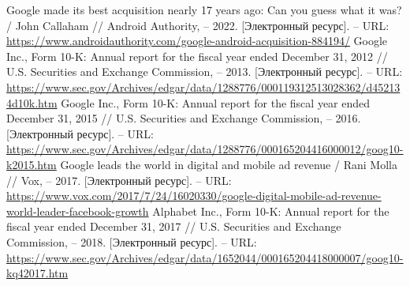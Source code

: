 \documentclass{article}
\begin{document}
\begin{thebibliography}{2}
 Google made its best acquisition nearly 17 years ago: Can you guess what it was? / John Callaham // Android Authority, – 2022. [Электронный ресурс]. – URL: \url{https://www.androidauthority.com/google-android-acquisition-884194/}
 Google Inc., Form 10-K: Annual report for the fiscal year ended December 31, 2012 // U.S. Securities and Exchange Commission, – 2013. [Электронный ресурс]. – URL: \url{https://www.sec.gov/Archives/edgar/data/1288776/000119312513028362/d452134d10k.htm}
 Google Inc., Form 10-K: Annual report for the fiscal year ended December 31, 2015 // U.S. Securities and Exchange Commission, – 2016. [Электронный ресурс]. – URL: \url{https://www.sec.gov/Archives/edgar/data/1288776/000165204416000012/goog10-k2015.htm}
 Google leads the world in digital and mobile ad revenue / Rani Molla // Vox, – 2017. [Электронный ресурс]. – URL: \url{https://www.vox.com/2017/7/24/16020330/google-digital-mobile-ad-revenue-world-leader-facebook-growth}
 Alphabet Inc., Form 10-K: Annual report for the fiscal year ended December 31, 2017 // U.S. Securities and Exchange Commission, – 2018. [Электронный ресурс]. – URL: \url{https://www.sec.gov/Archives/edgar/data/1652044/000165204418000007/goog10-kq42017.htm}
\end{thebibliography} 
\end{document}
